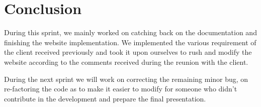 \section{Conclusion}

During this sprint, we mainly worked on catching back on the documentation and finishing the website implementation. We implemented the various requirement of the client received previously and took it upon ourselves to rush and modify the website according to the comments received during the reunion with the client. \newline

During the next sprint we will work on correcting the remaining minor bug, on re-factoring the code as to make it easier to modify for someone who didn't contribute in the development and prepare the final presentation.